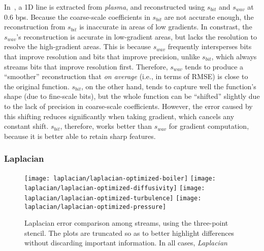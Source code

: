 In~, a 1D line is extracted from \emph{plasma}, and
reconstructed using $s_{bit}$ and $s_{wav}$ at 0.6 bps. Because the coarse-scale coefficients in
$s_{bit}$ are not accurate enough, the reconstruction from $s_{bit}$ is inaccurate in areas of low
gradients. In constrast, the $s_{wav}$'s reconstruction is accurate in low-gradient areas, but lacks
the resolution to resolve the high-gradient areas. This is because $s_{wav}$ frequently intersperses
bits that improve resolution and bits that improve precision, unlike $s_{bit}$, which always streams
bits that improve resolution first. Therefore, $s_{wav}$ tends to produce a ``smoother''
reconstruction that \emph{on average} (i.e., in terms of RMSE) is close to the original function.
$s_{bit}$, on the other hand, tends to capture well the function's shape (due to fine-scale bits),
but the whole function can be ``shifted'' slightly due to the lack of precision in coarse-scale
coefficients. However, the error caused by this shifting reduces significantly when taking gradient,
which cancels any constant shift. $s_{bit}$, therefore, works better than $s_{wav}$ for gradient
computation, because it is better able to retain sharp features.


\subsubsection{Laplacian}\label{sec:laplacian}

\begin{figure}[h]
	\centering
	{\texttt{[image: laplacian/laplacian-optimized-boiler]}}
	{\texttt{[image: laplacian/laplacian-optimized-diffusivity]}}
	{\texttt{[image: laplacian/laplacian-optimized-turbulence]}}
	{\texttt{[image: laplacian/laplacian-optimized-pressure]}}
	\caption{Laplacian error comparison among streams, using the three-point stencil. The plots are
	truncated so as to better highlight differences without discarding important information. In all
	cases, \emph{Laplacian}}\label{fig:laplacian-error-comparison}
\end{figure}


